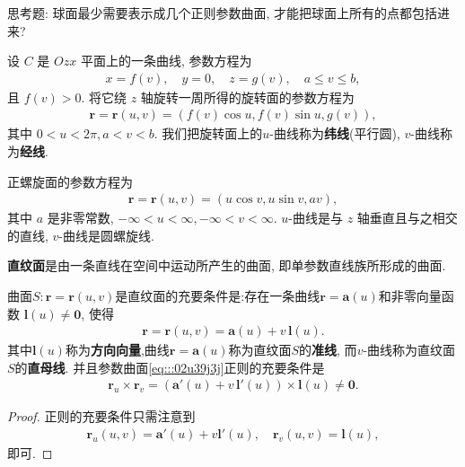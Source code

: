 \documentclass[../../main.tex]{subfiles}%
\begin{document}
\begin{remark}
思考题: 球面最少需要表示成几个正则参数曲面, 才能把球面上所有的点都包括进来?
\end{remark}

\begin{example}[旋转面]
设 \( C \) 是 \( Ozx \) 平面上的一条曲线, 参数方程为
\begin{align*}
x = f(v),\quad y = 0,\quad z = g(v),\quad a \leqslant v \leqslant b,
\end{align*}
且 \( f(v) > 0 \). 将它绕 \( z \) 轴旋转一周所得的旋转面的参数方程为
\begin{align*}
\bm{r} = \bm{r}(u, v) = (f(v)\cos u, f(v)\sin u, g(v)),
\end{align*}
其中 \( 0 < u < 2\pi, a < v < b \). 我们把旋转面上的\( u \)-曲线称为\textbf{纬线}(平行圆), \( v \)-曲线称为\textbf{经线}.
\end{example}

\begin{example}[正螺旋面]
正螺旋面的参数方程为
\begin{align*}
\bm{r} = \bm{r}(u, v) = (u\cos v, u\sin v, av),
\end{align*}
其中 \( a \) 是非零常数, \( -\infty < u < \infty, -\infty < v < \infty \). \( u \)-曲线是与 \( z \) 轴垂直且与之相交的直线, \( v \)-曲线是圆螺旋线.
\end{example}

\begin{definition}[直纹面]
\textbf{直纹面}是由一条直线在空间中运动所产生的曲面, 即单参数直线族所形成的曲面. 
\end{definition}

\begin{theorem}
曲面$S:\bm{r}=\bm{r}(u,v)$是直纹面的充要条件是:存在一条曲线\( \bm{r} = \bm{a}(u) \)和非零向量函数 \( \bm{l}(u) \neq \bm{0} \), 使得
\begin{align}\label{eq:::02u39j3j}
\bm{r} = \bm{r}(u, v) = \bm{a}(u) + v\,\bm{l}(u).
\end{align}
其中$\bm{l}(u)$称为\textbf{方向向量},曲线\( \bm{r} = \bm{a}(u) \)称为直纹面$S$的\textbf{准线},
而\( v \)-曲线称为直纹面$S$的\textbf{直母线}. 并且参数曲面\eqref{eq:::02u39j3j}正则的充要条件是
\begin{align*}
\bm{r}_u \times \bm{r}_v = (\bm{a}'(u) + v\,\bm{l}'(u)) \times \bm{l}(u) \neq \bm{0}.
\end{align*}
\end{theorem}
\begin{proof}
正则的充要条件只需注意到
\begin{align*}
\bm{r}_u(u,v)=\bm{a}'(u)+v\bm{l}'(u),\quad \bm{r}_v(u,v)=\bm{l}(u),
\end{align*}
即可.
\end{proof}
\end{document}
